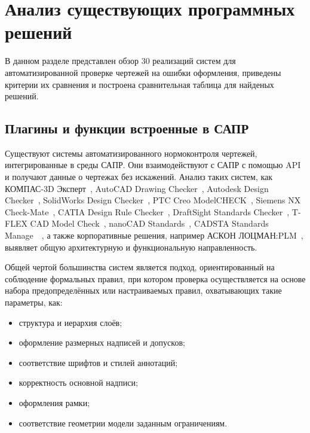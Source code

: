 \section{Анализ существующих программных решений}
В данном разделе представлен обзор 30 реализаций систем для автоматизированной проверке чертежей на ошибки оформления, приведены критерии их сравнения и построена сравнительная таблица для найденых решений.
 
\subsection{Плагины и функции встроенные в САПР}

Существуют системы автоматизированного нормоконтроля чертежей, интегрированные в среды САПР.
Они взаимодействуют с САПР с помощью API и получают данные о чертежах без искажений.
Анализ таких систем, как КОМПАС-3D Эксперт~\cite{compas-ecspert}, AutoCAD Drawing Checker~\cite{autocad-drawing-checker}, Autodesk Design Checker~\cite{autodesk-checker},
SolidWorks Design Checker~\cite{solidwork-checker}, PTC Creo ModelCHECK~\cite{creo-checker}, Sie\-mens NX Check-Mate~\cite{nx-checker}, CATIA Design Rule Checker~\cite{catia-checker}, DraftSight Standards Checker~\cite{drafsite-checker}, 
T-FLEX CAD Model Check~\cite{t-flex-checker}, nanoCAD Standards~\cite{nanocad-checker}, CADSTA Standards Manage~~\cite{cadsta-standards}, а также корпоративные решения, например АСКОН ЛОЦМАН:PLM~\cite{ascon-locman},
выявляет общую архитектурную и функциональную направленность.

Общей чертой большинства систем является подход, ориентированный на соблюдение формальных правил,
при котором проверка осуществляется на основе набора предопределённых или настраиваемых правил,
охватывающих такие параметры, как:
\begin{itemize}
    \item структура и иерархия слоёв;
    \item оформление размерных надписей и допусков;
    \item соответствие шрифтов и стилей аннотаций;
    \item корректность основной надписи;
    \item оформления рамки;
    \item соответствие геометрии модели заданным ограничениям.
\end{itemize}

